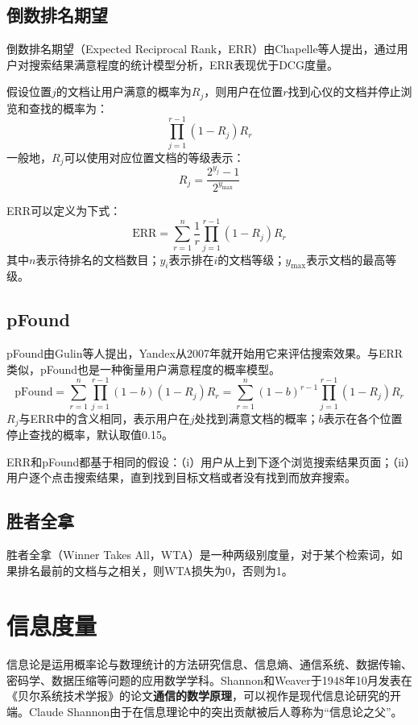 \subsection{倒数排名期望}
倒数排名期望（Expected Reciprocal Rank，ERR）由Chapelle等人\cite{chapelle2009expected}提出，通过用户对搜索结果满意程度的统计模型分析，ERR表现优于DCG度量。

假设位置$j$的文档让用户满意的概率为$R_j$，则用户在位置$r$找到心仪的文档并停止浏览和查找的概率为：
\[
    \prod_{j=1}^{r-1}{(1-R_j)R_r}
\]
一般地，$R_j$可以使用对应位置文档的等级表示：
\[
    R_j=\frac{2^{y_j}-1}{2^{y_{\max}}}
\]

ERR可以定义为下式：
\begin{equation}\label{eq:err}
    \text{ERR} = \sum_{r=1}^{n} \frac{1}{r}\prod_{j=1}^{r-1}{(1-R_j)}R_r
\end{equation}
其中$n$表示待排名的文档数目；$y_i$表示排在$i$的文档等级；$y_{\max}$表示文档的最高等级。

\subsection{pFound}
pFound由Gulin等人\cite{gulin2009pfound}提出，Yandex从2007年就开始用它来评估搜索效果。与ERR类似，pFound也是一种衡量用户满意程度的概率模型。
\begin{equation}\label{eq:pfound}
    \text{pFound} = \sum_{r=1}^{n}{\prod_{j=1}^{r-1}{(1-b)(1-R_j)R_r}} = \sum_{r=1}^{n}{(1-b)^{r-1}}\prod_{j=1}^{r-1}{(1-R_j)R_r}
\end{equation}
$R_j$与ERR中的含义相同，表示用户在$j$处找到满意文档的概率；$b$表示在各个位置停止查找的概率，默认取值0.15。

ERR和pFound都基于相同的假设：（i）用户从上到下逐个浏览搜索结果页面；（ii）用户逐个点击搜索结果，直到找到目标文档或者没有找到而放弃搜索。

\subsection{胜者全拿}
胜者全拿（Winner Takes All，WTA）是一种两级别度量，对于某个检索词，如果排名最前的文档与之相关，则WTA损失为0，否则为1。

\section{信息度量}
信息论是运用概率论与数理统计的方法研究信息、信息熵、通信系统、数据传输、密码学、数据压缩等问题的应用数学学科。Shannon和Weaver于1948年10月发表在《贝尔系统技术学报》的论文\textbf{通信的数学原理}\cite{shannon1948mathematical}，可以视作是现代信息论研究的开端。Claude Shannon由于在信息理论中的突出贡献被后人尊称为“信息论之父”。

